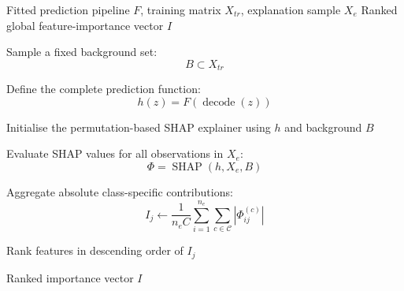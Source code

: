 \documentclass[a4paper,fleqn]{cas-dc}
\begin{document}
\begin{algorithm}[tbp]
\caption{Permutation-SHAP Procedure for Global Model Auditing}
\label{alg:shap}
\small
\setlength{\abovedisplayskip}{3pt}
\setlength{\belowdisplayskip}{3pt}
\begin{algorithmic}[1]

\Require Fitted prediction pipeline $F$, training matrix $X_{tr}$,
explanation sample $X_e$
\Ensure Ranked global feature-importance vector $I$

\State Sample a fixed background set:
\[
B\subset X_{tr}
\]

\State Define the complete prediction function:
\[
h(z)=F(\operatorname{decode}(z))
\]

\State Initialise the permutation-based SHAP explainer
using $h$ and background $B$

\State Evaluate SHAP values for all observations in $X_e$:
\[
\Phi=\operatorname{SHAP}(h,X_e,B)
\]


    \State Aggregate absolute class-specific contributions:
    \[
    I_j\gets
    \frac{1}{n_eC}
    \sum_{i=1}^{n_e}
    \sum_{c\in\mathcal{C}}
    \left|\Phi_{ij}^{(c)}\right|
    \]

\EndFor

\State Rank features in descending order of $I_j$

\State \Return Ranked importance vector $I$

\end{algorithmic}
\end{algorithm}
\end{document}
